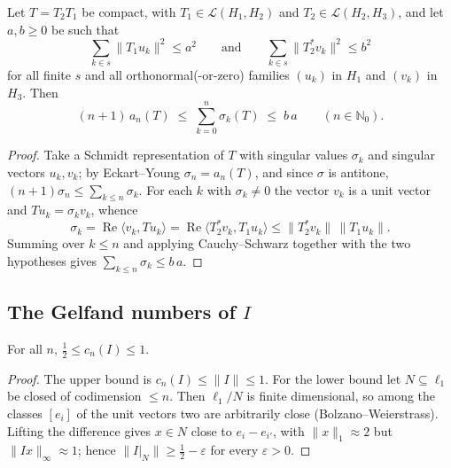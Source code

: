 \begin{theorem}
\label{thm:hs-product-bound}
\leanok
{}
Let $T = T_2 T_1$ be compact, with $T_1 \in \mathcal{L}(H_1, H_2)$ and
$T_2 \in \mathcal{L}(H_2, H_3)$, and let $a, b \ge 0$ be such that
\[
  \sum_{k \in s} \|T_1 u_k\|^2 \le a^2
  \qquad\text{and}\qquad
  \sum_{k \in s} \|T_2^{*} v_k\|^2 \le b^2
\]
for all finite $s$ and all orthonormal(-or-zero) families $(u_k)$ in $H_1$ and
$(v_k)$ in $H_3$. Then
\[
  (n+1)\, a_n(T) \;\le\; \sum_{k=0}^{n} \sigma_k(T) \;\le\; b\,a
  \qquad (n \in \mathbb{N}_0).
\]
\end{theorem}
\begin{proof}
\leanok
{}
Take a Schmidt representation of $T$ with singular values $\sigma_k$ and
singular vectors $u_k, v_k$; by Eckart--Young $\sigma_n = a_n(T)$, and since
$\sigma$ is antitone, $(n+1)\sigma_n \le \sum_{k \le n} \sigma_k$. For each $k$
with $\sigma_k \ne 0$ the vector $v_k$ is a unit vector and $T u_k = \sigma_k v_k$,
whence
\[
  \sigma_k = \operatorname{Re}\langle v_k, T u_k\rangle
           = \operatorname{Re}\langle T_2^{*} v_k, T_1 u_k\rangle
           \le \|T_2^{*} v_k\|\,\|T_1 u_k\| .
\]
Summing over $k \le n$ and applying Cauchy--Schwarz together with the two
hypotheses gives $\sum_{k \le n}\sigma_k \le b\,a$.
\end{proof}

\subsection{The Gelfand numbers of \texorpdfstring{$I$}{I}}
\label{sec:l1-linf-gelfand}

\begin{proposition}
\label{prop:l1-linf-gelfand}
\leanok
For all $n$, $\tfrac12 \le c_n(I) \le 1$.
\end{proposition}
\begin{proof}
\leanok
{}
The upper bound is $c_n(I) \le \|I\| \le 1$. For the lower bound let
$N \subseteq \ell_1$ be closed of codimension $\le n$. Then $\ell_1/N$ is
finite dimensional, so among the classes $[e_i]$ of the unit vectors two are
arbitrarily close (Bolzano--Weierstrass). Lifting the difference gives
$x \in N$ close to $e_i - e_{i'}$, with $\|x\|_1 \approx 2$ but
$\|I x\|_\infty \approx 1$; hence $\|I|_N\| \ge \tfrac12 - \varepsilon$ for
every $\varepsilon > 0$.
\end{proof}

